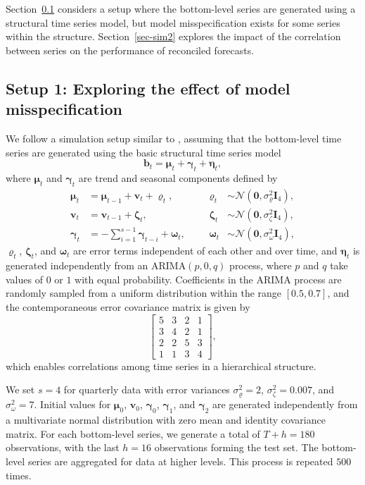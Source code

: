 \documentclass[
  11pt]{article}
\theoremstyle{plain}
\theoremstyle{remark}
\begin{document}
Section~\ref{sec-sim1} considers a setup where the bottom-level series
are generated using a structural time series model, but model
misspecification exists for some series within the structure.
Section~\ref{sec-sim2} explores the impact of the correlation between
series on the performance of reconciled forecasts.

\subsection{Setup 1: Exploring the effect of model
misspecification}\label{sec-sim1}

We follow a simulation setup similar to \citet{Wickramasuriya2019-fc},
assuming that the bottom-level time series are generated using the basic
structural time series model \[
\bm{b}_t=\bm{\mu}_t+\bm{\gamma}_t+\bm{\eta}_t,
\] where \(\bm{\mu}_t\) and \(\bm{\gamma}_t\) are trend and seasonal
components defined by \begin{align*}
\bm{\mu}_t & =\bm{\mu}_{t-1}+\bm{v}_t+\bm{\varrho}_t, &&& \bm{\varrho}_t & \sim \mathcal{N}\left(\bm{0}, \sigma_{\varrho}^2 \bm{I}_4\right), \\
\bm{v}_t & =\bm{v}_{t-1}+\bm{\zeta}_t, &&& \bm{\zeta}_t & \sim \mathcal{N}\left(\bm{0}, \sigma_\zeta^2 \bm{I}_4\right), \\
\bm{\gamma}_t & =-\sum_{i=1}^{s-1} \bm{\gamma}_{t-i}+\bm{\omega}_t, &&& \bm{\omega}_t & \sim \mathcal{N}\left(\bm{0}, \sigma_\omega^2 \bm{I}_4\right),
\end{align*} \(\bm{\varrho}_t\), \(\bm{\zeta}_t\), and \(\bm{\omega}_t\)
are error terms independent of each other and over time, and
\(\bm{\eta}_t\) is generated independently from an
\(\text{ARIMA}(p,0,q)\) process, where \(p\) and \(q\) take values of
\(0\) or \(1\) with equal probability. Coefficients in the ARIMA process
are randomly sampled from a uniform distribution within the range
\([0.5, 0.7]\), and the contemporaneous error covariance matrix is given
by \[
\left[\begin{array}{llll}
5 & 3 & 2 & 1 \\
3 & 4 & 2 & 1 \\
2 & 2 & 5 & 3 \\
1 & 1 & 3 & 4
\end{array}\right],
\] which enables correlations among time series in a hierarchical
structure.

We set \(s = 4\) for quarterly data with error variances
\(\sigma_{\varrho}^2=2\), \(\sigma_\zeta^2=0.007\), and
\(\sigma_\omega^2=7\). Initial values for \(\bm{\mu}_0\), \(\bm{v}_0\),
\(\bm{\gamma}_0\), \(\bm{\gamma}_1\), and \(\bm{\gamma}_2\) are
generated independently from a multivariate normal distribution with
zero mean and identity covariance matrix. For each bottom-level series,
we generate a total of \(T+h = 180\) observations, with the last
\(h = 16\) observations forming the test set. The bottom-level series
are aggregated for data at higher levels. This process is repeated
\(500\) times.
\end{document}
